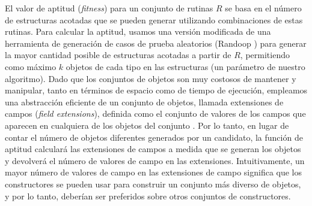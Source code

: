 El valor de aptitud (\emph{fitness}) para un conjunto de rutinas \( R \) se basa en el número de estructuras acotadas que se pueden generar utilizando combinaciones de estas rutinas. Para calcular la aptitud, usamos una versión modificada de una herramienta de generación de casos de prueba aleatorios (Randoop \cite{ref24}) para generar la mayor cantidad posible de estructuras acotadas a partir de \( R \), permitiendo como máximo \( k \) objetos de cada tipo en las estructuras (un parámetro de nuestro algoritmo). Dado que los conjuntos de objetos son muy costosos de mantener y manipular, tanto en términos de espacio como de tiempo de ejecución, empleamos una abstracción eficiente de un conjunto de objetos, llamada extensiones de campos (\emph{field extensions}), definida como el conjunto de valores de los campos que aparecen en cualquiera de los objetos del conjunto \cite{ref25}. Por lo tanto, en lugar de contar el número de objetos diferentes generados por un candidato, la función de aptitud calculará las extensiones de campos a medida que se generan los objetos y devolverá el número de valores de campo en las extensiones. Intuitivamente, un mayor número de valores de campo en las extensiones de campo significa que los constructores se pueden usar para construir un conjunto más diverso de objetos, y por lo tanto, deberían ser preferidos sobre otros conjuntos de constructores.


